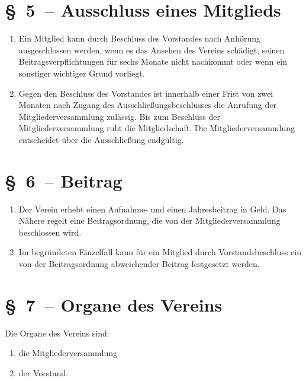 \documentclass[11pt,DIV12]{scrartcl}
\renewcommand*{\labelenumi}{(\theenumi)}
\begin{document}
\section*{§~5~-- Ausschluss eines Mitglieds}
\begin{enumerate}
\item Ein Mitglied kann durch Beschluss des Vorstandes nach Anhörung ausgeschlossen werden, wenn es das Ansehen des Vereins schädigt, seinen Beitragsverpflichtungen für sechs Monate nicht nachkommt oder wenn ein sonstiger wichtiger Grund vorliegt.
\item Gegen den Beschluss des Vorstandes ist innerhalb einer Frist von zwei Monaten nach Zugang des Ausschließungsbeschlusses die Anrufung der Mitgliederversammlung zulässig. Bis zum Beschluss der Mitgliederversammlung ruht die Mitgliedschaft. Die Mitgliederversammlung entscheidet über die Ausschließung endgültig.
\end{enumerate}

\section*{§~6~-- Beitrag}
\begin{enumerate}
\item Der Verein erhebt einen Aufnahme- und einen Jahresbeitrag in Geld. Das Nähere regelt eine Beitragsordnung, die von der Mitgliederversammlung beschlossen wird.
\item Im begründeten Einzelfall kann für ein Mitglied durch Vorstandsbeschluss ein von der Beitragsordnung abweichender Beitrag festgesetzt werden.
\end{enumerate}

\section*{§~7~-- Organe des Vereins}
Die Organe des Vereins sind:
\begin{enumerate}
    \renewcommand*{\labelenumi}{\theenumi.}
    \addtolength{\leftmargini}{-3pt}
    \addtolength{\leftmargini}{\parindent}
    \item die Mitgliederversammlung
    \item der Vorstand.
\end{enumerate}
\end{document}
